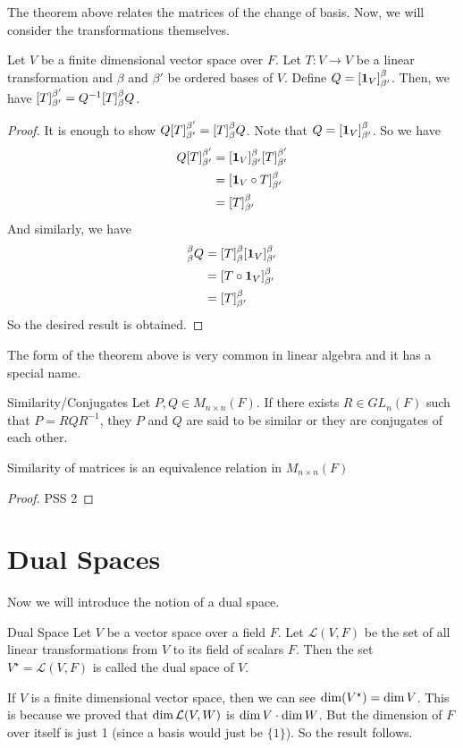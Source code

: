 \documentclass[main.tex]{subfiles}
\begin{document}
    The theorem above relates the matrices of the change of basis. Now, we will consider the transformations themselves. 
    \begin{thrm}{}{}
        Let $V$ be a finite dimensional vector space over $F$. Let $T: V\to V$ be a linear transformation and $\beta$ and $\beta'$ be ordered bases of $V$. Define $Q = [\mathbf{1}_V]_{\beta'}^\beta$. Then, we have $[T]_{\beta'}^{\beta'} = Q^{-1}[T]_\beta^\beta Q$.
    \end{thrm}
    \begin{proof}
        It is enough to show $Q[T]_{\beta'}^{\beta'} = [T]_\beta^\beta Q$. Note that $Q = [\mathbf{1}_V]_{\beta'}^\beta$. So we have 
        \begin{align*}
            Q[T]_{\beta'}^{\beta'} &= [\mathbf{1}_V]_{\beta'}^\beta [T]_{\beta'}^{\beta'} \\ 
            &= [\mathbf{1}_V \circ T]_{\beta'}^\beta \\ 
            &= [T]_{\beta'}^\beta 
        \end{align*}
        And similarly, we have 
        \begin{align*}
            [T]_\beta^\beta Q &= [T]_\beta^\beta [\identitymapV]_\betap^\beta \\
            &= [T\circ \identitymapV]_\betap^\beta \\
            &= [T]_\betap^\beta
        \end{align*}
        So the desired result is obtained. 
    \end{proof}

    The form of the theorem above is very common in linear algebra and it has a special name. 
    \begin{defn}{Similarity/Conjugates}{}
        Let $P,Q\in M_{n\times n}(F)$. If there exists $R\in GL_n(F)$ such that $P = RQR^{-1}$, they $P$ and $Q$ are said to be similar or they are conjugates of each other. 
    \end{defn}
    \begin{prop}{}{}
        Similarity of matrices is an equivalence relation in $M_{n\times n}(F)$
    \end{prop}
    \begin{proof}
        PSS 2
    \end{proof}

    \section{Dual Spaces}
    Now we will introduce the notion of a dual space. 
    \begin{defn}{Dual Space}{}
        Let $V$ be a vector space over a field $F$. Let $\mathcal{L}(V, F)$ be the set of all linear transformations from $V$ to its field of scalars $F$. Then the set $V^\star = \mathcal{L}(V, F)$ is called the dual space of $V$. 
    \end{defn}
    If $V$ is a finite dimensional vector space, then we can see $\operatorname{dim} (V^\star) = \operatorname{dim} V$. This is because we proved that $\operatorname{dim} \mathcal{L}(V, W)$ is $\operatorname{dim} V \cdot \operatorname{dim} W$. But the dimension of $F$ over itself is just 1 (since a basis would just be $\{1\}$). So the result follows. \par 
\end{document}
